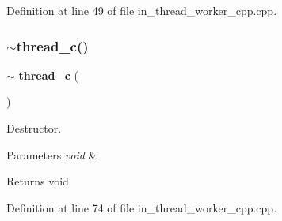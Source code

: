 Definition at line 49 of file in\+\_\+thread\+\_\+worker\+\_\+cpp.\+cpp.

\mbox{\label{group___thread_ga2781f947f90a41282029110d5f146134}} 
\subsubsection{$\sim$thread\_c()}
{\footnotesize\ttfamily $\sim$\textbf{ thread\+\_\+c} (\begin{DoxyParamCaption}\item[{void}]{ }\end{DoxyParamCaption})}



Destructor. 


\begin{DoxyParams}{Parameters}
{\em void} & \\
\hline
\end{DoxyParams}
\begin{DoxyReturn}{Returns}
void 
\end{DoxyReturn}


Definition at line 74 of file in\+\_\+thread\+\_\+worker\+\_\+cpp.\+cpp.

